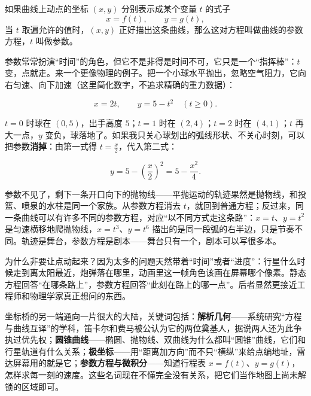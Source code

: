 \begin{dingyi}[参数方程]
如果曲线上动点的坐标 $(x,y)$ 分别表示成某个变量 $t$ 的式子
\[
x=f(t),\qquad y=g(t),
\]
当 $t$ 取遍允许的值时，$(x,y)$ 正好描出这条曲线，那么这对方程叫做曲线的参数方程，$t$ 叫做参数。
\end{dingyi}

参数常常扮演“时间”的角色，但它不是非得是时间不可，它只是一个“指挥棒”：$t$ 变，点就走。来一个更像物理的例子。把一个小球水平抛出，忽略空气阻力，它向右匀速、向下加速（这里简化数字，不追求精确的重力数据）：

\[
x=2t,\qquad y=5-t^{2}\quad(t\ge 0).
\]

$t=0$ 时球在 $(0,5)$，出手高度 $5$；$t=1$ 时在 $(2,4)$；$t=2$ 时在 $(4,1)$；$t$ 再大一点，$y$ 变负，球落地了。如果我只关心球划出的弧线形状、不关心时刻，可以把参数\textbf{消掉}：由第一式得 $t=\frac{x}{2}$，代入第二式：

\[
y=5-\left(\frac{x}{2}\right)^{2}=5-\frac{x^{2}}{4}.
\]

参数不见了，剩下一条开口向下的抛物线——平抛运动的轨迹果然是抛物线，和投篮、喷泉的水柱是同一个家族。从参数方程消去 $t$，就回到普通方程；反过来，同一条曲线可以有许多不同的参数方程，对应“以不同方式走这条路”：$x=t$、$y=t^{2}$ 是匀速横移地爬抛物线，$x=t^{3}$、$y=t^{6}$ 描出的是同一段弧的右半边，只是节奏不同。轨迹是舞台，参数方程是剧本——舞台只有一个，剧本可以写很多本。

为什么非要让点动起来？因为太多的问题天然带着“时间”或者“进度”：行星什么时候走到离太阳最近，炮弹落在哪里，动画里这一帧角色该画在屏幕哪个像素。静态方程回答“在哪条路上”，参数方程回答“此刻在路上的哪一点”。后者显然更接近工程师和物理学家真正想问的东西。

\begin{pandeng}
坐标桥的另一端通向一片很大的大陆，关键词包括：\textbf{解析几何}——系统研究“方程与曲线互译”的学科，笛卡尔和费马被公认为它的两位奠基人，据说两人还为此争执过优先权；\textbf{圆锥曲线}——椭圆、抛物线、双曲线为什么都叫“圆锥”曲线，它们和行星轨道有什么关系；\textbf{极坐标}——用“距离加方向”而不只“横纵”来给点编地址，雷达屏幕用的就是它；\textbf{参数方程与微积分}——知道行程表 $x=f(t)$、$y=g(t)$，怎样求每一刻的速度。这些名词现在不懂完全没有关系，把它们当作地图上尚未解锁的区域即可。
\end{pandeng}

